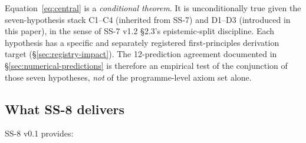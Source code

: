 \documentclass[11pt,letterpaper]{article}
\theoremstyle{definition}
\begin{document}
Equation~\eqref{eq:central} is a \emph{conditional theorem}. It is unconditionally true given the seven-hypothesis stack C1--C4 (inherited from SS-7) and D1--D3 (introduced in this paper), in the sense of SS-7 v1.2 \S2.3's epistemic-split discipline. Each hypothesis has a specific and separately registered first-principles derivation target (\S\ref{sec:registry-impact}). The 12-prediction agreement documented in \S\ref{sec:numerical-predictions} is therefore an empirical test of the conjunction of those seven hypotheses, \emph{not} of the programme-level axiom set alone.

\subsection{What SS-8 delivers}
\label{sec:deliverables}

SS-8 v0.1 provides:
\end{document}
